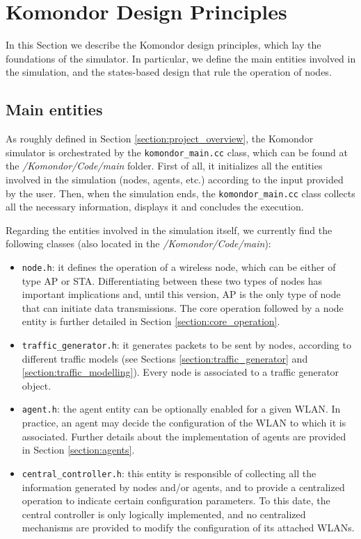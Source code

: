 \documentclass[a4paper]{article}
\begin{document}
\section{Komondor Design Principles}
\label{section:system_model}
In this Section we describe the Komondor design principles, which lay the foundations of the simulator. In particular, we define the main entities involved in the simulation, and the states-based design that rule the operation of nodes.

\subsection{Main entities}
\label{section:main_entities}
As roughly defined in Section \ref{section:project_overview}, the Komondor simulator is orchestrated by the \texttt{komondor\_main.cc} class, which can be found at the \textit{/Komondor/Code/main} folder. First of all, it initializes all the entities involved in the simulation (nodes, agents, etc.) according to the input provided by the user. Then, when the simulation ends, the \texttt{komondor\_main.cc} class collects all the necessary information, displays it and concludes the execution.

Regarding the entities involved in the simulation itself, we currently find the following classes (also located in the \textit{/Komondor/Code/main}):
\begin{itemize}
	\item \texttt{node.h}: it defines the operation of a wireless node, which can be either of type AP or STA. Differentiating between these two types of nodes has important implications and, until this version, AP is the only type of node that can initiate data transmissions. The core operation followed by a node entity is further detailed in Section \ref{section:core_operation}.
	\item  \texttt{traffic\_generator.h}: it generates packets to be sent by nodes, according to different traffic models (see Sections \ref{section:traffic_generator} and \ref{section:traffic_modelling}). Every node is associated to a traffic generator object.
	\item \texttt{agent.h}: the agent entity can be optionally enabled for a given WLAN. In practice, an agent may decide the configuration of the WLAN to which it is associated. Further details about the implementation of agents are provided in Section \ref{section:agents}.
	\item \texttt{central\_controller.h}: this entity is responsible of collecting all the information generated by nodes and/or agents, and to provide a centralized operation to indicate certain configuration parameters. To this date, the central controller is only logically implemented, and no centralized mechanisms are provided to modify the configuration of its attached WLANs.
\end{itemize}
\end{document}
